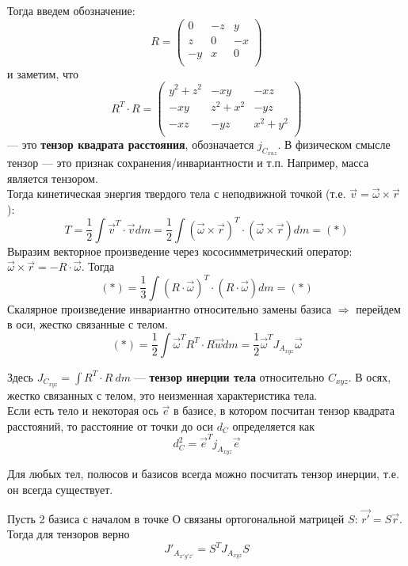 Тогда введем обозначение:
\[
R = \begin{pmatrix}
0 & -z & y\\
z & 0 & -x\\
-y & x & 0\\
\end{pmatrix}
\]
и заметим, что
\[
R^T \cdot R = \begin{pmatrix}
    y^2 + z^2 & -xy & -xz\\
    -xy & z^2 + x^2 & -yz\\
    -xz & -yz & x^2 + y^2\\
\end{pmatrix}
\]
--- это \textbf{тензор квадрата расстояния}, обозначается $j_{C_{xuz}}$. В физическом смысле тензор --- это признак сохранения/инвариантности и т.п. Например, масса является тензором.\\

Тогда кинетическая энергия твердого тела с неподвижной точкой (т.е. $\vec{v} = \vec{\omega}\times \vec{r}$):
\[
T = \dfrac{1}{2}\int \vec{v}^T \cdot \vec{v}dm = \dfrac{1}{2}\int (\vec{\omega} \times \vec{r})^T \cdot (\vec{\omega} \times \vec{r})dm = (*)
\]
Выразим векторное произведение через кососимметрический оператор: $\vec{\omega} \times \vec{r} = - R \cdot \vec{\omega}$. Тогда
\[
(*) = \dfrac{1}{3}\int (R \cdot \vec{\omega})^T \cdot (R \cdot \vec{\omega})dm = (*)
\]
Скалярное произведение инвариантно относительно замены базиса $\Longrightarrow$ перейдем в оси, жестко связанные с телом.
\[
(*) = \dfrac{1}{2}\int \vec{\omega}^T R^T\cdot R \vec{w} dm = \dfrac{1}{2}\vec{\omega}^TJ_{A_{xyz}}\vec{\omega}
\]

Здесь $J_{C_{xyz}} = \int R^T \cdot R ~dm$ --- \textbf{тензор инерции тела} относительно $C_{xyz}$. В осях, жестко связанных с телом, это неизменная характеристика тела.\\

Если есть тело и некоторая ось $\vec{e}$ в базисе, в котором посчитан тензор квадрата расстояний, то расстояние от точки до оси $d_C$ определяется как
\[
d_C^2 = \vec{e}^T j_{A_{xyz}}\vec{e}
\]

\begin{proposition}
    Для любых тел, полюсов и базисов всегда можно посчитать тензор инерции, т.е. он всегда существует.
\end{proposition}
\begin{proposition}
    Пусть 2 базиса с началом в точке О связаны ортогональной матрицей $S$: $\vec{r'} = S\vec{r}$. Тогда для тензоров верно
    \[
    {J'}_{A_{x'y'z'}} = S^T J_{A_{xyz}}S
    \]
\end{proposition}

